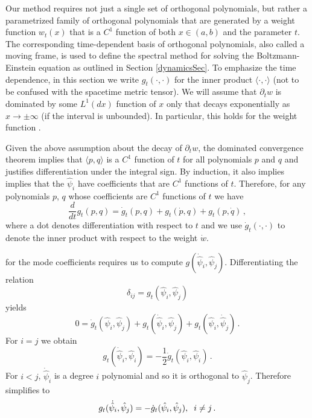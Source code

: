 \label{ortho-polynom-fam}
Our method requires not just a single set of orthogonal polynomials, but rather a parametrized family of orthogonal polynomials that are generated by a weight function $w_t(x)$ that is a $C^1$ function of both $x\in(a,b)$ and the parameter $t$. The corresponding time-dependent basis of orthogonal polynomials, also called a moving frame, is used to define the spectral method for solving the  Boltzmann-Einstein equation as outlined in Section \ref{dynamicsSec}.  To emphasize the time dependence, in this section we write $g_t(\cdot,\cdot)$ for the inner product $\langle\cdot,\cdot\rangle$ (not to be confused with the spacetime metric tensor).  We will assume that $\partial_t w$ is dominated by some $L^1(dx)$ function of $x$ only that decays exponentially as $x\rightarrow\pm\infty$ (if the interval is unbounded). In particular, this holds for the weight function .

Given the above assumption about the decay of $\partial_t w$, the dominated convergence theorem implies that $\langle p,q\rangle$ is a $C^1$ function of $t$ for all polynomials $p$ and $q$ and justifies  differentiation under the integral sign. By induction, it also implies implies that the $\hat\psi_i$ have coefficients that are $C^1$ functions of $t$. Therefore, for any polynomials $p$, $q$ whose coefficients are $C^1$ functions of $t$ we have
\begin{equation}
\frac{d}{dt}g_t( p,q)=\dot{g}_t(p,q)+g_t(\dot{p},q)+g_t( p,\dot{q})\,,
\end{equation}
where a dot denotes differentiation with respect to $t$ and we use $\dot{g}_t(\cdot,\cdot)$ to denote the inner product with respect to the weight $\dot{w}$.  

 for the mode coefficients requires us to compute $g(\dot{\hat\psi}_i,\hat\psi_j)$.  Differentiating the relation
\begin{equation}
\delta_{ij}=g_t(\hat\psi_i,\hat\psi_j)
\end{equation}
yields
\begin{equation}\label{orthoDerivEq}
0=\dot g_t(\hat\psi_i,\hat\psi_j)+g_t(\dot{\hat\psi}_i,\hat\psi_j)+g_t(\hat\psi_i,\dot{\hat\psi}_j)\,.
\end{equation}
For $i=j$ we obtain
\begin{equation}\label{normDerivEq}
g_t(\dot{\hat\psi}_i,\hat\psi_i)=-\frac{1}{2}\dot{g}_t(\hat\psi_i,\hat\psi_i)\,.
\end{equation}
For $i<j$, $\dot{\hat\psi}_i$ is a degree $i$ polynomial and so it is orthogonal to $\hat\psi_j$. Therefore  simplifies to
\begin{equation}
g_t(\dot{\hat\psi}_i,\hat\psi_j)=-\dot{g}_t(\hat\psi_i,\hat\psi_j),\hspace{2mm} i\neq j\,.
\end{equation}

